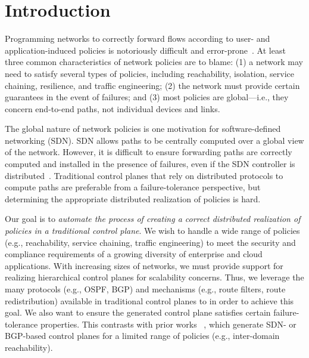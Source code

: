 \section{Introduction}
Programming networks to correctly forward flows according to user- and
application-induced policies is notoriously difficult and
error-prone~\cite{troubleshooting, bgpmisconfig}. At least three common characteristics of
network policies are to blame: (1) a network may need to satisfy several
types of policies, including reachability, isolation, service
chaining, resilience, and traffic engineering; (2) the network
must provide certain guarantees in the event of failures; and (3) most policies are global---i.e., they
concern end-to-end paths, not individual devices and links.


The global nature of network policies is one motivation for software-defined
networking (SDN). SDN allows paths to be centrally computed over a global view
of the network. However, it is difficult to ensure forwarding paths are
correctly computed and installed in the presence of failures, even if the SDN
controller is distributed~\cite{hasdn}.
Traditional control planes that rely on distributed protocols to
compute paths are preferable from a failure-tolerance perspective, but
determining the appropriate distributed realization of policies is hard.




Our goal is to {\em automate the process of creating a correct distributed
	realization of policies in a traditional control plane}. We wish to 
handle a wide range of policies (e.g., reachability, service chaining, traffic
engineering) to meet the security and compliance requirements of a 
growing diversity of enterprise and cloud applications. With increasing
sizes of networks, we must provide support for realizing 
hierarchical control planes for scalability concerns. Thus, 
we leverage the many protocols (e.g., OSPF, BGP) and mechanisms
(e.g., route filters, route redistribution) available in traditional control
planes to in order to achieve this goal. 
We also want to ensure the generated control plane satisfies
certain failure-tolerance properties. This contrasts with
prior works
~\cite{netegg, propane, merlin,simple,fattire, netkat, netkatcompiler, sol}, which generate SDN- or BGP-based
control planes for a limited range of policies (e.g., inter-domain
reachability).

